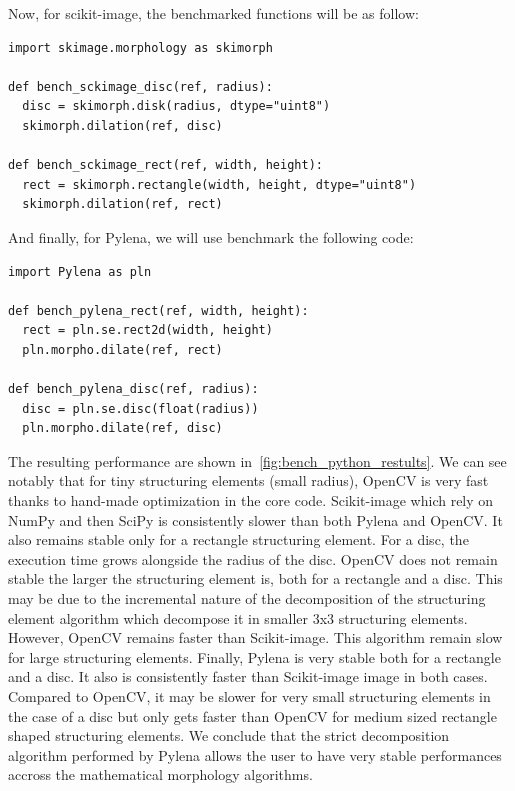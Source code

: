 Now, for scikit-image, the benchmarked functions will be as follow:
\begin{verbatim}
import skimage.morphology as skimorph

def bench_sckimage_disc(ref, radius):
  disc = skimorph.disk(radius, dtype="uint8")
  skimorph.dilation(ref, disc)

def bench_sckimage_rect(ref, width, height):
  rect = skimorph.rectangle(width, height, dtype="uint8")
  skimorph.dilation(ref, rect)
\end{verbatim}

And finally, for Pylena, we will use benchmark the following code:
\begin{verbatim}
import Pylena as pln

def bench_pylena_rect(ref, width, height):
  rect = pln.se.rect2d(width, height)
  pln.morpho.dilate(ref, rect)

def bench_pylena_disc(ref, radius):
  disc = pln.se.disc(float(radius))
  pln.morpho.dilate(ref, disc)
\end{verbatim}

The resulting performance are shown in~\cref{fig:bench_python_restults}. We can see notably that for tiny structuring
elements (small radius), OpenCV is very fast thanks to hand-made optimization in the core code. Scikit-image which rely
on NumPy and then SciPy is consistently slower than both Pylena and OpenCV. It also remains stable only for a rectangle
structuring element. For a disc, the execution time grows alongside the radius of the disc. OpenCV does not remain
stable the larger the structuring element is, both for a rectangle and a disc. This may be due to the incremental nature
of the decomposition of the structuring element algorithm which decompose it in smaller 3x3 structuring elements.
However, OpenCV remains faster than Scikit-image. This algorithm remain slow for large structuring elements. Finally,
Pylena is very stable both for a rectangle and a disc. It also is consistently faster than Scikit-image image in both
cases. Compared to OpenCV, it may be slower for very small structuring elements in the case of a disc but only gets
faster than OpenCV for medium sized rectangle shaped structuring elements. We conclude that the strict decomposition
algorithm performed by Pylena allows the user to have very stable performances accross the mathematical morphology
algorithms.

